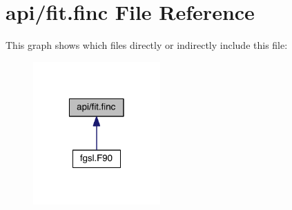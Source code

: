 \hypertarget{fit_8finc}{\section{api/fit.finc File Reference}
\label{fit_8finc}
}
This graph shows which files directly or indirectly include this file\-:
\nopagebreak
\begin{figure}[H]
\begin{center}
\leavevmode
\includegraphics[width=138pt]{fit_8finc__dep__incl}
\end{center}
\end{figure}

